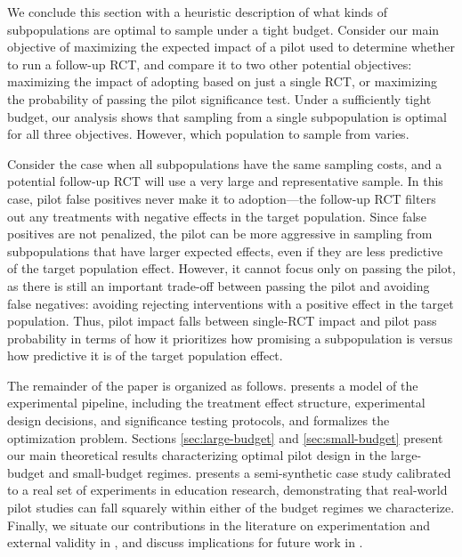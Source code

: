 We conclude this section with a heuristic description of what kinds of subpopulations are optimal to sample under a tight budget.
Consider our main objective of maximizing the expected impact of a pilot used to determine whether to run a follow-up RCT, and compare it to two other potential objectives: maximizing the impact of adopting based on just a single RCT, or maximizing the probability of passing the pilot significance test.
Under a sufficiently tight budget, our analysis shows that sampling from a single subpopulation is optimal for all three objectives.
However, which population to sample from varies.

Consider the case when all subpopulations have the same sampling costs, and a potential follow-up RCT will use a very large and representative sample.
In this case, pilot false positives never make it to adoption---the follow-up RCT filters out any treatments with negative effects in the target population.
Since false positives are not penalized, the pilot can be more aggressive in sampling from subpopulations that have larger expected effects, even if they are less predictive of the target population effect.
However, it cannot focus only on passing the pilot, as there is still an important trade-off between passing the pilot and avoiding false negatives:  avoiding rejecting interventions with a positive effect in the target population.
Thus, pilot impact falls between single-RCT impact and pilot pass probability in terms of how it prioritizes how promising a subpopulation is versus how predictive it is of the target population effect.

The remainder of the paper is organized as follows.
 presents a model of the experimental pipeline, including the treatment effect structure, experimental design decisions, and significance testing protocols, and formalizes the optimization problem.
Sections \ref{sec:large-budget} and \ref{sec:small-budget} present our main theoretical results characterizing optimal pilot design in the large-budget and small-budget regimes.
 presents a semi-synthetic case study calibrated to a real set of experiments in education research, demonstrating that real-world pilot studies can fall squarely within either of the budget regimes we characterize.
Finally, we situate our contributions in the literature on experimentation and external validity in , and discuss implications for future work in .
